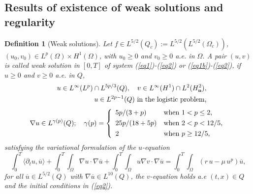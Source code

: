 \documentclass[11pt,reqno]{amsart}%
\newtheorem{definition}[theorem]{Definition}
\numberwithin{equation}{section}
\begin{document}
\subsection{Results of existence of weak solutions and regularity}\label{2.2}
\begin{definition}[Weak solutions]\label{weak}
Let $f\in L^{5/2}(Q_c):=L^{5/2}(L^{5/2}(\Omega_c))$, 
$(u_0,v_0)\in L^{p}(\Omega)\times H^{1}(\Omega)$, with
$u_0\ge0$ and $v_0\ge 0$ a.e. in $\Omega$. 
A pair $(u,v)$ is called weak solution in $[0,T]$ of system
(\ref{eq1})-(\ref{eq2}) or  (\ref{eq1b})-(\ref{eq2}),
if $u\ge 0$ and $v\ge 0$ a.e. in $Q$,
\begin{eqnarray} \label{st-11}
&& u\in L^{\infty}(L^p)\cap L^{{5p}/{3}}(Q),\quad v\in L^\infty(H^1)\cap L^2(H^2_{\bf n}),\\
&& u\in L^{2p-1}(Q)\ \mbox{in  the logistic problem,}\label{stt1}
\end{eqnarray}
\begin{equation} \label{st-11-bis}
\nabla u\in L^{\gamma(p)}(Q);
\quad \gamma(p)=
\left\{
\begin{array}{ll}
5p/(3+p)& \hbox{when $1<p\le 2$,}\\
\noalign{\vspace{-2ex}}\\
25p/(18+5p)& \hbox{when $2<p<12/5$,} \\
\noalign{\vspace{-2ex}}\\
2 & \hbox{when $p\ge 12/5$,} 
\end{array}
\right.
\end{equation}
%
satisfying the variational formulation  of the $u$-equation
\begin{equation}\label{var2}
\int_0^T\langle \partial_tu,\overline{u}\rangle+\int_0^T\int_\Omega \nabla u\cdot \nabla  \overline{u}+\int_0^T\int_\Omega u\nabla v\cdot\nabla \overline{u}=\int_0^T\int_\Omega (r\,u-\mu \, u^p)\overline{u},
\end{equation}
for all $\overline{u}\in L^{5/2}(Q)
$ with $\nabla \overline{u} \in L^{10}(Q)$, 
 the $v$-equation 
  holds a.e $(t,x)\in Q$ and the initial conditions in (\ref{eq2}). 
\end{definition}
\end{document}
